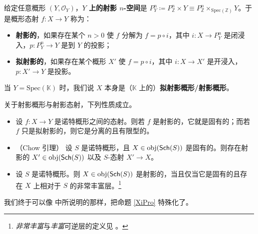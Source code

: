 \begin{Def}
给定任意概形 $(Y,\mathcal{O}_Y)$，\textbf{$Y$ 上的射影 $n$-空间}是 $P_Y^n\coloneqq P_\mathbb{Z}^n\times Y\equiv P_\mathbb{Z}^n\times_{\text{Spec}(\mathbb{Z})} Y$。于是概形态射 $f:X\rightarrow Y$ 称为：
\begin{itemize}[leftmargin=0.5cm]
	\item \textbf{射影的}，如果存在某个 $n>0$ 使 $f$ 分解为 $f=p\circ i$，其中 $i:X\rightarrow P_Y^n$ 是闭浸入，$p:P_Y^n\rightarrow Y$ 是到 $Y$ 的投影； 
	
	\item \textbf{拟射影的}，如果存在某个概形 $X'$ 使 $f=p\circ i$，其中 $i:X\rightarrow X'$ 是开浸入，$p:X'\rightarrow Y$ 是投影。
\end{itemize}
当 $Y=\text{Spec}(\mathbb{K})$ 时，我们说 $X$ 本身是（$\mathbb{K}$ 上的）\textbf{拟射影概形/射影概形}。
\end{Def}

\begin{Pro}\label{whenproper}
关于射影概形与射影态射，下列性质成立。
\begin{itemize}[leftmargin=0.5cm]
	\item 设 $f:X\rightarrow Y$ 是诺特概形之间的态射。则若 $f$ 是射影的，它就是固有的；而若 $f$ 只是拟射影的，则它是分离的且有限型的。
	
	\item \textup{（Chow 引理）} 设 $S$ 是诺特概形，且 $X\in\textup{obj}(\mathsf{Sch}(S))$ 是固有的。则存在射影的 $X'\in\textup{obj}(\mathsf{Sch}(S))$ 以及 $S$-态射 $X'\rightarrow X$。
	
	\item 设 $S$ 是诺特概形。则 $X\in\textup{obj}(\mathsf{Sch}(S))$ 是射影的，当且仅当它是固有的且存在 $X$ 上相对于 $S$ 的非常丰富层。\footnote{\textit{非常丰富}与\textit{丰富}可逆层的定义见 \cite[第 II.5、II.7 节]{[Har77]}。} 
\end{itemize}
\end{Pro}

我们终于可以像 \cite[命题 II.4.10、例 II.3.2.1]{[Har77]} 中所说明的那样，把命题 \ref{XiPro} 特殊化了。

